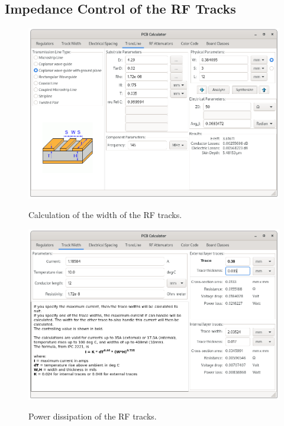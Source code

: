 \subsection{Impedance Control of the RF Tracks}

\begin{figure}[!ht]
    \begin{center}
        \includegraphics[width=\textwidth]{figures/rf-track-width}
        \label{fig:rf-track-width-calc}
        \caption{Calculation of the width of the RF tracks.}
    \end{center}
\end{figure}

\begin{figure}[!ht]
    \begin{center}
        \includegraphics[width=\textwidth]{figures/rf-track-width-power}
        \label{fig:rf-track-width-power-calc}
        \caption{Power dissipation of the RF tracks.}
    \end{center}
\end{figure}

